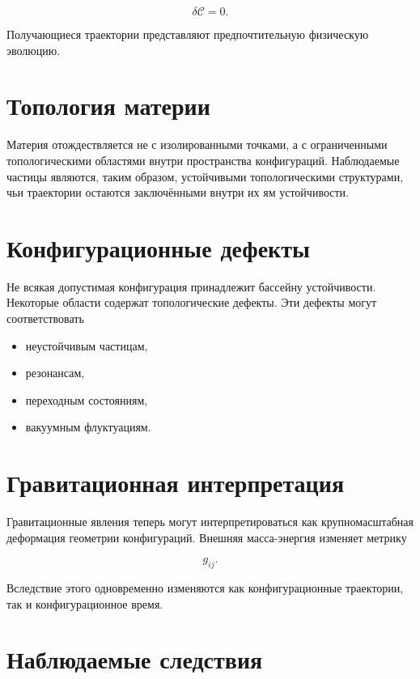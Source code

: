 \[ \boxed{ \delta \mathcal C = 0. } \]

Получающиеся траектории представляют предпочтительную физическую эволюцию.

\section{Топология материи}

Материя отождествляется не с изолированными точками, а с ограниченными топологическими областями внутри пространства конфигураций. Наблюдаемые частицы являются, таким образом, устойчивыми топологическими структурами, чьи траектории остаются заключёнными внутри их ям устойчивости.

\section{Конфигурационные дефекты}

Не всякая допустимая конфигурация принадлежит бассейну устойчивости. Некоторые области содержат топологические дефекты. Эти дефекты могут соответствовать

\begin{itemize}

\item неустойчивым частицам,

\item резонансам,

\item переходным состояниям,

\item вакуумным флуктуациям.

\end{itemize}

\section{Гравитационная интерпретация}

Гравитационные явления теперь могут интерпретироваться как крупномасштабная деформация геометрии конфигураций. Внешняя масса-энергия изменяет метрику

\[ g_{ij}. \]

Вследствие этого одновременно изменяются как конфигурационные траектории, так и конфигурационное время.

\section{Наблюдаемые следствия}

